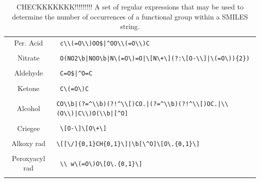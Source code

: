 \begin{table}[H]
\begin{tabular}{c|p{5in}}
Per. Acid & \verb! c\\(=O\\)OO$|^OO\\(=O\\)C!\\&\\


Nitrate & \verb! O(NO2\b|NOO\b|N\(=O\)=O|\[N\+\](?:\[O-\\]|\(=O\)){2})!\\&\\

Aldehyde & \verb! C=O$|^O=C!\\&\\

Ketone & \verb! C\(=O\)C!\\&\\

Alcohol & \verb-CO\\b|(?=^\\b)(?!^\\[)CO.|(?=^\\b)(?!^\\[)OC.|\\(O\\)|C\\)O(\\b|[^O]-\\&\\

Criegee & \verb! \[O-\]\[O\+\]!\\&\\

Alkoxy rad & \verb!\[[\/]{0,1}CH{0,1}\]|\b[\^O]\[O\.{0,1}\]!\\&\\

Peroxyacyl rad & \verb! \\ w\(=O\)O\[O\.{0,1}\]!\\&\\

    \end{tabular}

    \caption{CHECKKKKKKK!!!!!!!!!  A set of regular expressions that may be used to determine the number of occurrences of a functional group within a SMILES string.}
    \label{tab:fngroups}
\end{table}



